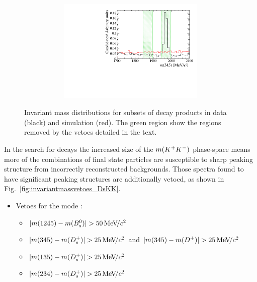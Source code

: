 \begin{figure}[!h]
\begin{subfigure}[t]{1.0\textwidth}
\begin{subfigure}[t]{0.32\textwidth}
         \includegraphics[width=1.0\textwidth]{figs/Selection/Veto_Comparison_B2DsPhi_Ds2KPiPi_m345.pdf}
      \end{subfigure}
      \caption{\decay{\Bp}{(\decay{\Dsp}{\Kp\pim\pip})\phiz}}
   \end{subfigure}

   \caption{Invariant mass distributions for subsets of decay products in data (black) and simulation (red). The green region show the regions removed by the vetoes detailed in the text.}
   \label{fig:invariantmassvetoes}   
\end{figure}


In the search for \decay{\Bp}{\Dsp\Kp\Km} decays the increased size of the $m({{K}^+}{{K}^-})$ phase-space means more of the combinations of final state particles are susceptible to sharp peaking structure from incorrectly reconstructed backgrounds. Those spectra found to have significant peaking structures are additionally vetoed, as shown in Fig.~\ref{fig:invariantmassvetoes_DsKK}.

\begin{itemize}
\item Vetoes for the mode \decay{\Bp}{(\decay{\Dsp}{\Kp\Km\pip})\Kp\Km}:
\begin{itemize}
\item $|m(\text{1245})- m({{B}^0_{s}})| > 50{\mathrm{\,Me\kern -0.1em V\!/}c^2}$
\item $|m(\text{345})- m({{D}^+_{s}})| > 25{\mathrm{\,Me\kern -0.1em V\!/}c^2}$ and $|m(\text{345})- m({{D}^+})| > 25{\mathrm{\,Me\kern -0.1em V\!/}c^2}$
\item $|m(\text{135})- m({{D}^+_{s}})| > 25{\mathrm{\,Me\kern -0.1em V\!/}c^2}$
\item $|m(\text{234})- m({{D}^+_{s}})| > 25{\mathrm{\,Me\kern -0.1em V\!/}c^2}$
\end{itemize}
\end{itemize}

